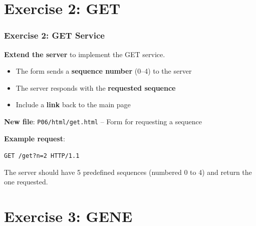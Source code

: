 \documentclass[xcolor=table]{beamer}
\begin{document}
\section{Exercise 2: GET}

\begin{frame}
\frametitle{Exercise 2: GET Service}

\textbf{Extend the server} to implement the GET service.

\vspace{0.2cm}

\begin{itemize}
\item The form sends a \textbf{sequence number} (0--4) to the server
\item The server responds with the \textbf{requested sequence}
\item Include a \textbf{link} back to the main page
\end{itemize}

\vspace{0.3cm}

\textbf{New file}: \texttt{P06/html/get.html} -- Form for requesting a sequence

\vspace{0.3cm}

\textbf{Example request}:

\vspace{0.1cm}

\begin{center}
\texttt{GET /get?n=2 HTTP/1.1}
\end{center}

\vspace{0.2cm}

The server should have 5 predefined sequences (numbered 0 to 4) and return the one requested.

\end{frame}


\section{Exercise 3: GENE}
\end{document}
